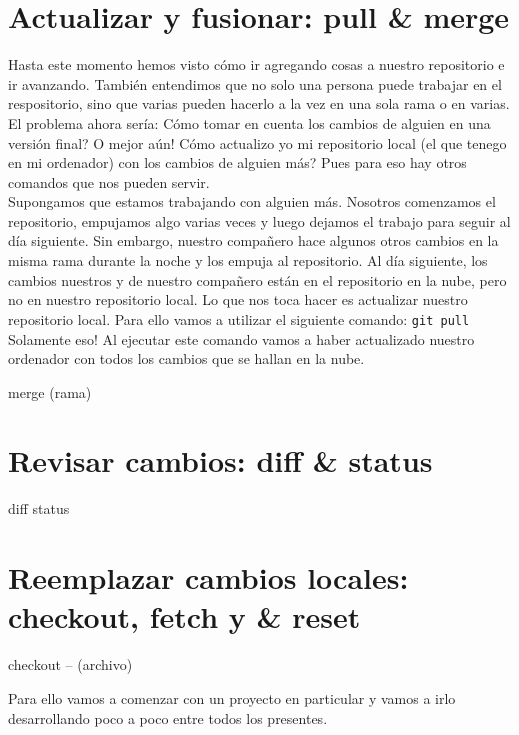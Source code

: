 \documentclass[10pt,letterpaper]{article}
\newcommand{\inlinecode}[1]{
\colorbox{light-gray}{\texttt{#1}}
}
\begin{document}
\section{Actualizar y fusionar: pull \& merge}
Hasta este momento hemos visto c\'omo ir agregando cosas a nuestro repositorio e ir avanzando. Tambi\'en entendimos que no solo una persona puede trabajar en el respositorio, sino que varias pueden hacerlo a la vez en una sola rama o en varias. El problema ahora ser\'ia: C\'omo tomar en cuenta los cambios de alguien en una versi\'on final? O mejor a\'un! C\'omo actualizo yo mi repositorio local (el que tenego en mi ordenador) con los cambios de alguien m\'as? Pues para eso hay otros comandos que nos pueden servir.\\

Supongamos que estamos trabajando con alguien m\'as. Nosotros comenzamos el repositorio, empujamos algo varias veces y luego dejamos el trabajo para seguir al d\'ia siguiente. Sin embargo, nuestro compa\~nero hace algunos otros cambios en la misma rama durante la noche y los empuja al repositorio. Al d\'ia siguiente, los cambios nuestros y de nuestro compa\~nero est\'an en el repositorio en la nube, pero no en nuestro repositorio local. Lo que nos toca hacer es actualizar nuestro repositorio local. Para ello vamos a utilizar el siguiente comando: \inlinecode{git pull} Solamente eso! Al ejecutar este comando vamos a haber actualizado nuestro ordenador con todos los cambios que se hallan en la nube.

merge (rama)

\section{Revisar cambios: diff \& status}
diff
status

\section{Reemplazar cambios locales: checkout, fetch y \& reset}
checkout -- (archivo)

Para ello vamos a comenzar con un proyecto en particular y vamos a irlo desarrollando poco a poco entre todos los presentes.
\end{document}
